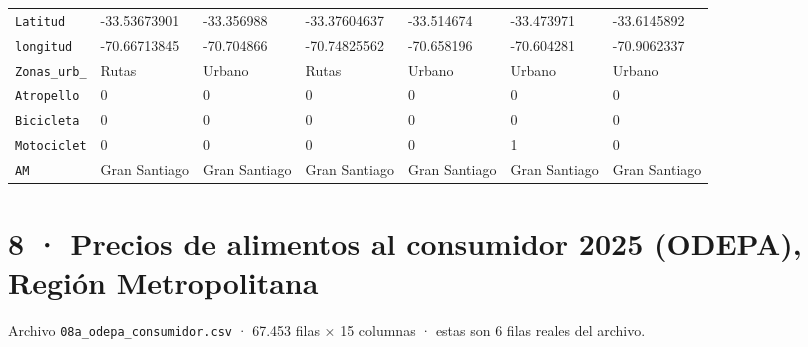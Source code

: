 \documentclass[10pt]{article}
\begin{document}
\begin{xltabular}{\linewidth}{@{}p{4.3cm} Y Y Y Y Y Y @{}}
\texttt{Latitud} & -{}33.53673901 & -{}33.356988 & -{}33.37604637 & -{}33.514674 & -{}33.473971 & -{}33.6145892 \\
\texttt{longitud} & -{}70.66713845 & -{}70.704866 & -{}70.74825562 & -{}70.658196 & -{}70.604281 & -{}70.9062337 \\
\texttt{Zonas\_\allowbreak{}urb\_\allowbreak{}} & Rutas & Urbano & Rutas & Urbano & Urbano & Urbano \\
\texttt{Atropello} & 0 & 0 & 0 & 0 & 0 & 0 \\
\texttt{Bicicleta} & 0 & 0 & 0 & 0 & 0 & 0 \\
\texttt{Motociclet} & 0 & 0 & 0 & 0 & 1 & 0 \\
\texttt{AM} & Gran Santiago & Gran Santiago & Gran Santiago & Gran Santiago & Gran Santiago & Gran Santiago \\
\end{xltabular}
\normalsize

\clearpage
\hypertarget{base8}{}
\section{8 · Precios de alimentos al consumidor 2025 (ODEPA), Región Metropolitana}
\small Archivo \texttt{08a\_odepa\_consumidor.csv} · 67.453 filas × 15 columnas · estas son 6 filas reales del archivo.\normalsize
\end{document}
